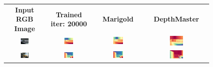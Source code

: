 \documentclass{article}
\begin{document}
\begin{figure}[H]
  \centering
  \begin{tabular}{cccc}
    \textbf{Input RGB Image} & \textbf{Trained iter: 20000} & \textbf{Marigold} & \textbf{DepthMaster} \\
    \includegraphics[width=0.22\textwidth]{images/test-image/inside-01.jpg} &
    \includegraphics[width=0.22\textwidth]{images/trained/inside-01_pred_colored.png} &
    \includegraphics[width=0.22\textwidth]{images/pretrained/inside-01_pred_colored.png} &
    \includegraphics[width=0.22\textwidth]{images/depthmaster/inside-01_pred_colored.jpg} \\

    \includegraphics[width=0.22\textwidth]{images/test-image/synthetic-inside-01.jpg} &
    \includegraphics[width=0.22\textwidth]{images/trained/synthetic-inside-01_pred_colored.png} &
    \includegraphics[width=0.22\textwidth]{images/pretrained/synthetic-inside-01_pred_colored.png} &
    \includegraphics[width=0.22\textwidth]{images/depthmaster/synthetic-inside-01_pred_colored.jpg} \\


\end{tabular}
\end{figure}
\end{document}
